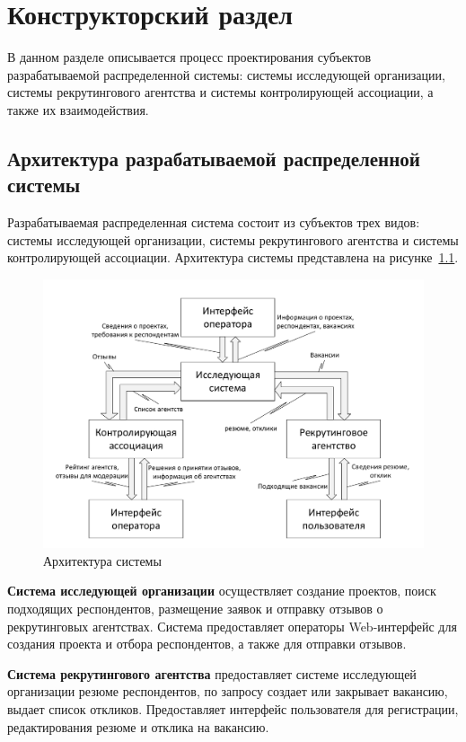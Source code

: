 \chapter{Конструкторский раздел}
\label{cha:design}

В данном разделе описывается процесс проектирования субъектов разрабатываемой распределенной системы: системы исследующей организации, системы рекрутингового агентства и системы контролирующей ассоциации, а также их взаимодействия.

\section{Архитектура разрабатываемой распределенной системы}

Разрабатываемая распределенная система состоит из субъектов трех видов: системы исследующей организации, системы рекрутингового агентства и системы контролирующей ассоциации. Архитектура системы представлена на рисунке~\ref{fig:arch}.

\begin{figure}[ht]
  \centering
  \includegraphics[width=\textwidth]{include/arch.pdf}
\caption{Архитектура системы}
\label{fig:arch}
\end{figure}

\textbf{Система исследующей организации} осуществляет создание проектов, поиск подходящих респондентов, размещение заявок и отправку отзывов о рекрутинговых агентствах. Система предоставляет операторы Web-интерфейс для создания проекта и отбора респондентов, а также для отправки отзывов. 

\textbf{Система рекрутингового агентства} предоставляет системе исследующей организации резюме респондентов, по запросу создает или закрывает вакансию, выдает список откликов. Предоставляет интерфейс пользователя для регистрации, редактирования резюме и отклика на вакансию. 

